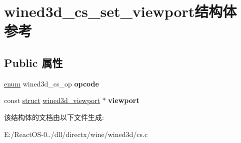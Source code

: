\hypertarget{structwined3d__cs__set__viewport}{}\section{wined3d\+\_\+cs\+\_\+set\+\_\+viewport结构体 参考}
\label{structwined3d__cs__set__viewport}
\subsection*{Public 属性}
\begin{DoxyCompactItemize}
\item 
\mbox{\label{structwined3d__cs__set__viewport_ab6d782364e72b609edb8466765801bc9}} 
\hyperlink{interfaceenum}{enum} wined3d\+\_\+cs\+\_\+op {\bfseries opcode}
\item 
\mbox{\label{structwined3d__cs__set__viewport_abbfa3adb75ceb639e9cf12c84a477b4b}} 
const \hyperlink{interfacestruct}{struct} \hyperlink{structwined3d__viewport}{wined3d\+\_\+viewport} $\ast$ {\bfseries viewport}
\end{DoxyCompactItemize}


该结构体的文档由以下文件生成\+:\begin{DoxyCompactItemize}
\item 
E\+:/\+React\+O\+S-\/0../dll/directx/wine/wined3d/cs.\+c\end{DoxyCompactItemize}
